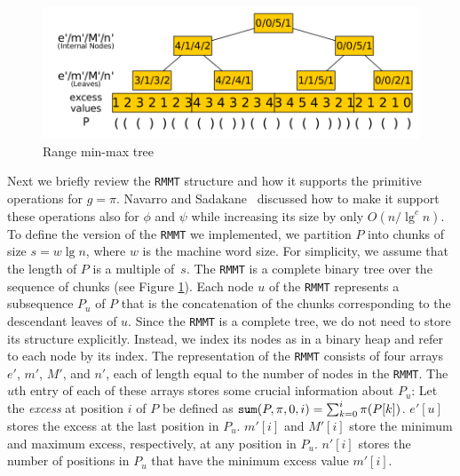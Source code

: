 \begin{figure}[t]
  \centerline{\includegraphics[scale=0.28]{./images/Range-min-max-tree.png}}
  \vspace{1ex}
  \caption{Range min-max tree}
  \label{fig:RangeMinMaxTree}
\end{figure}

Next we briefly review the {\tt RMMT} structure and how it supports
the primitive operations for $g = \pi$.  Navarro and
Sadakane~\cite{Navarro:2014:FFS:2620785.2601073} discussed how to make
it support these operations also for $\phi$ and $\psi$ while
increasing its size by only $O(n/\lg^c n)$.  To define the version of
the {\tt RMMT} we implemented, we partition $P$ into chunks
of size $s = w \lg n$, where $w$ is the machine word size.  For
simplicity, we assume that the length of $P$ is a multiple of~$s$.
The {\tt RMMT} is a complete binary tree over the sequence of
chunks (see Figure \ref{fig:RangeMinMaxTree}). Each node $u$ of the {\tt RMMT} represents a subsequence $P_u$
of $P$ that is the concatenation of the chunks corresponding to the
descendant leaves of $u$.  Since the {\tt RMMT} is a complete tree, we
do not need to store its structure explicitly.  Instead, we index its
nodes as in a binary heap and refer to each node by its index.  The
representation of the {\tt RMMT} consists of four arrays $e'$, $m'$,
$M'$, and $n'$, each of length equal to the number of nodes in the
{\tt RMMT}.  The $u$th entry of each of these arrays stores some
crucial information about $P_u$: Let the {\em excess} at position $i$
of $P$ be defined as $\mathtt{sum}(P,\pi,0,i) = \sum_{k=0}^{i} \pi(P[k])$.
$e'[u]$ stores the excess at the last position in $P_u$.  $m'[i]$ and
$M'[i]$ store the minimum and maximum excess, respectively, at any position in
$P_u$.  $n'[i]$ stores the number of positions in $P_u$ that
have the minimum excess value $m'[i]$.

